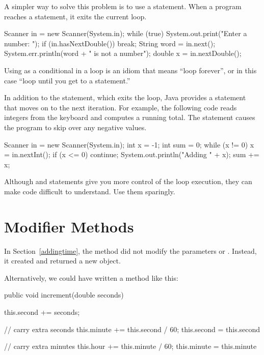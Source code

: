 
A simpler way to solve this problem is to use a  statement.
When a program reaches a  statement, it exits the current loop.

\begin{code}
Scanner in = new Scanner(System.in);
while (true) {
    System.out.print("Enter a number: ");
    if (in.hasNextDouble()) {
        break;
    }
    String word = in.next();
    System.err.println(word + " is not a number");
}
double x = in.nextDouble();
\end{code}

Using  as a conditional in a  loop is an idiom that means ``loop forever'', or in this case ``loop until you get to a  statement.''


In addition to the  statement, which exits the loop, Java provides a  statement that moves on to the next iteration.
For example, the following code reads integers from the keyboard and computes a running total.
The  statement causes the program to skip over any negative values.

\begin{code}
Scanner in = new Scanner(System.in);
int x = -1;
int sum = 0;
while (x != 0) {
    x = in.nextInt();
    if (x <= 0) {
        continue;
    }
    System.out.println("Adding " + x);
    sum += x;
}
\end{code}

Although  and  statements give you more control of the loop execution, they can make code difficult to understand.
Use them sparingly.


\section{Modifier Methods}

In Section~\ref{addingtime}, the  method did not modify the parameters  or .
Instead, it created and returned a new  object.

Alternatively, we could have written a method like this:

\begin{code}
public void increment(double seconds) {
    this.second += seconds;

    // carry extra seconds
    this.minute += this.second / 60;
    this.second = this.second %

    // carry extra minutes
    this.hour += this.minute / 60;
    this.minute = this.minute %
}
\end{code}

